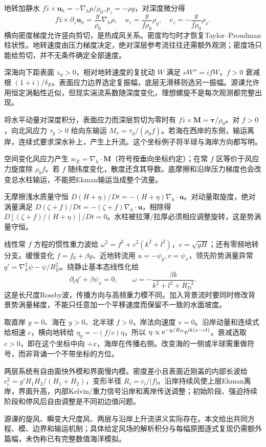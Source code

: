 地转加静水 $f\hat z\times\mathbf u_h=-\nabla_hp/\rho_0,p_z=-\rho g$，对深度微分得
\[
f\hat z\times\partial_z\mathbf u_h=\frac g{\rho_0}\nabla_h\rho,
\quad u_z=\frac g{f\rho_0}\rho_y,
\quad v_z=-\frac g{f\rho_0}\rho_x.
\]
横向密度梯度允许竖向剪切，是热成风关系。密度均匀时才恢复Taylor--Proudman柱状性。地转速度由压力梯度决定，绝对深层参考流往往还需额外观测；密度场只能给剪切，并不无条件确定全部速度。

深海向下距表面 $z_d>0$，相对地转速度的复扰动 $W$ 满足 $\nu W''=ifW$，$f>0$ 衰减根 $(1+i)/\delta_E$。表面应力边界选定复振幅，底层无滑移则选另一振幅。源课允许用恒定涡黏性近似，但现实湍流系数随深度变化，理想螺旋不是每次观测都完整出现。

将水平动量对深度积分，表面应力而深层剪切为零时有 $f\hat z\times\mathbf M=\boldsymbol\tau/\rho_0$。对 $f>0$，向北风应力 $\tau_y>0$ 给向东输运 $M_x=\tau_y/(\rho_0f)$。若海在西岸的东侧，输运离岸，连续式要求深水补上，产生上升流。这个坐标例子将半球与海岸方向都写明。

空间变化风应力产生 $w_E=\nabla_h\cdot\mathbf M$（符号按垂向坐标约定）；在常 $f$ 区等价于风应力旋度除 $\rho_0f$。若 $f$ 随纬度变化，散度还含其导数。底摩擦和沿岸压力梯度也会改变总水柱输运，不能把Ekman输运当成整个流量。

无摩擦浅水质量守恒 $D(H+\eta)/Dt=-(H+\eta)\nabla_h\cdot\mathbf u$。对动量取旋度，绝对涡量满足 $D(\zeta+f)/Dt=-(\zeta+f)\nabla_h\cdot\mathbf u$，相除得 $D[(\zeta+f)/(H+\eta)]/Dt=0$。水柱被拉薄/拉厚必须相应调整旋转，这是势涡量守恒。

线性常 $f$ 方程的惯性重力波给 $\omega^2=f^2+c^2(k^2+l^2)$，$c=\sqrt{gH}$；还有零频地转分支。缓慢变化 $f=f_0+\beta y$、近地转流用 $u=-\psi_y,v=\psi_x$，领先阶势涡量异常 $q'=\nabla_h^2\psi-\psi/R_D^2$。绕静止基本态线性化给
\[
\partial_tq'+\beta\psi_x=0,\qquad
\omega=-\frac{\beta k}{k^2+l^2+R_D^{-2}}.
\]
这是长尺度Rossby波，传播方向与高频重力模不同。加入背景流时要同时修改背景势涡量梯度，不能只任意加一个平移速度而保留不一致的水面坡度。

取直岸 $y=0$、海在 $y>0$、北半球 $f>0$，岸法向速度 $v=0$。沿岸动量和连续式给相速 $c$，横向地转给 $\eta_y=-(f/c)\eta$，所以 $\eta\propto\mathrm e^{-y/R_D}\mathrm e^{ik(x-ct)}$。衰减选取 $c>0$，即在这个坐标中向 $+x$，海岸在传播右侧。改变海的一侧或半球需重做符号，而非背诵一个不带坐标的方位。

两层系统有自由面快外模和界面慢内模。密度差小且表面近刚盖的内部长波给 $c_i^2=g'H_1H_2/(H_1+H_2)$，变形半径 $R_i=c_i/|f|$。沿岸持续风使上层Ekman离岸，界面升高，内部Kelvin/重力信号沿岸和离岸传送调整；初始阶段、强迫持续阶段和停风后自由调整是不同初边值问题。

源课的旋风、瞬变大尺度风、两层与沿岸上升流讲义实际存在。本文给出共同方程、模、边界和输运机制；具体给定风场的解析积分与每幅原图逐式复现仍需额外篇幅，未伪称已有完整数值海洋模拟。
